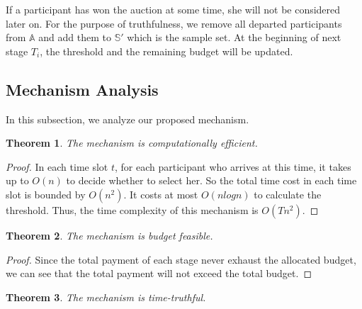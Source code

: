 \documentclass[conference,compsocconf,letterpaper,10pt]{IEEEtran}
\newtheorem{theorem}{Theorem}
\begin{document}
If a participant has won the auction at some time, she will not be considered later on. For the purpose of truthfulness, we remove all departed participants from $\mathbb{A}$ and add them to $\mathbb{S}'$ which is the sample set. At the beginning of next stage $T_i$, the threshold and the remaining budget will be updated.

\subsection{Mechanism Analysis}

In this subsection, we analyze our proposed mechanism.

\begin{theorem}
The mechanism is computationally efficient.
\end{theorem}

\begin{proof}
In each time slot $t$, for each participant who arrives at this time, it takes up to $O(n)$ to decide whether to select her. So the total time cost in each time slot is bounded by $O(n^2)$. It costs at most $O(nlogn)$ to calculate the threshold. Thus, the time complexity of this mechanism is $O(Tn^2)$.
\end{proof}

\begin{theorem}
The mechanism is budget feasible.
\end{theorem}

\begin{proof}
Since the total payment of each stage never exhaust the allocated budget, we can see that the total payment will not exceed the total budget.
\end{proof}

\begin{theorem}
The mechanism is time-truthful.
\end{theorem}
\end{document}
